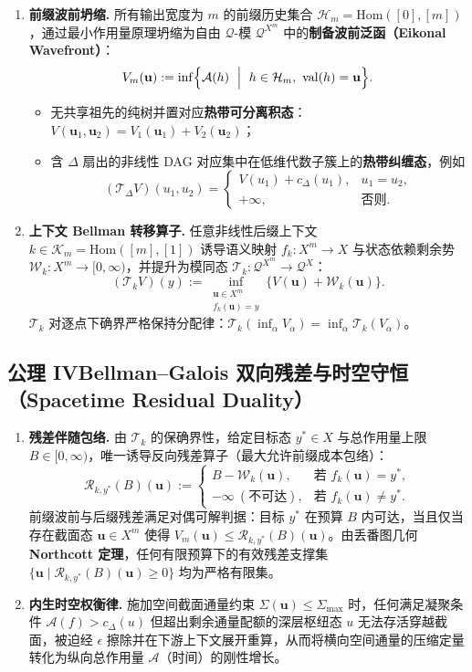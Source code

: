 \documentclass[11pt,a4paper]{ctexart}
\theoremstyle{plain}
\theoremstyle{definition}
\newcommand{\cA}{\mathcal{A}}
\newcommand{\cH}{\mathcal{H}}
\newcommand{\cK}{\mathcal{K}}
\newcommand{\cQ}{\mathcal{Q}}
\newcommand{\cT}{\mathcal{T}}
\newcommand{\cR}{\mathcal{R}}
\newcommand{\cW}{\mathcal{W}}
\newcommand{\cTDelta}{\mathcal{T}_{\Delta}}
\newcommand{\val}{\mathrm{val}}
\newcommand{\Hom}{\mathrm{Hom}}
\begin{document}
\begin{enumerate}
\item \textbf{前缀波前坍缩.} 所有输出宽度为 $m$ 的前缀历史集合 $\cH_m = \Hom([0], [m])$，通过最小作用量原理坍缩为自由 $\cQ$-模 $\cQ^{X^m}$ 中的\textbf{制备波前泛函（Eikonal Wavefront）}：
\[
V_m(\mathbf{u}) := \inf\Bigl\{ \cA(h) \ \Bigm|\ h \in \cH_m,\ \val(h) = \mathbf{u} \Bigr\}.
\]
\begin{itemize}
\item 无共享祖先的纯树并置对应\textbf{热带可分离积态}：$V(\mathbf{u}_1, \mathbf{u}_2) = V_1(\mathbf{u}_1) + V_2(\mathbf{u}_2)$；
\item 含 $\Delta$ 扇出的非线性 DAG 对应集中在低维代数子簇上的\textbf{热带纠缠态}，例如
\[
(\cTDelta V)(u_1, u_2) = \begin{cases} V(u_1) + c_\Delta(u_1), & u_1 = u_2, \\ +\infty, & \text{否则}. \end{cases}
\]
\end{itemize}

\item \textbf{上下文 Bellman 转移算子.} 任意非线性后缀上下文 $k \in \cK_m = \Hom([m], [1])$ 诱导语义映射 $f_k: X^m \to X$ 与状态依赖剩余势 $\cW_k: X^m \to [0, \infty)$，并提升为模同态 $\cT_k : \cQ^{X^m} \to \cQ^{X}$：
\[
(\cT_k V)(y) := \inf_{\substack{\mathbf{u} \in X^m \\ f_k(\mathbf{u}) = y}} \bigl\{ V(\mathbf{u}) + \cW_k(\mathbf{u}) \bigr\}.
\]
$\cT_k$ 对逐点下确界严格保持分配律：$\cT_k(\inf_\alpha V_\alpha) = \inf_\alpha \cT_k(V_\alpha)$。
\end{enumerate}

\subsection*{公理 IV\quad Bellman--Galois 双向残差与时空守恒（Spacetime Residual Duality）}

\begin{enumerate}
\item \textbf{残差伴随包络.} 由 $\cT_k$ 的保确界性，给定目标态 $y^* \in X$ 与总作用量上限 $B \in [0, \infty)$，唯一诱导反向残差算子（最大允许前缀成本包络）：
\[
\cR_{k, y^*}(B)(\mathbf{u}) :=
\begin{cases}
B - \cW_k(\mathbf{u}), & \text{若 } f_k(\mathbf{u}) = y^*, \\[2pt]
-\infty\ (\text{不可达}), & \text{若 } f_k(\mathbf{u}) \neq y^*.
\end{cases}
\]
前缀波前与后缀残差满足对偶可解判据：目标 $y^*$ 在预算 $B$ 内可达，当且仅当存在截面态 $\mathbf{u} \in X^m$ 使得 $V_m(\mathbf{u}) \le \cR_{k, y^*}(B)(\mathbf{u})$。由丢番图几何 \textbf{Northcott 定理}，任何有限预算下的有效残差支撑集 $\{\mathbf{u} \mid \cR_{k, y^*}(B)(\mathbf{u}) \ge 0\}$ 均为严格有限集。

\item \textbf{内生时空权衡律.} 施加空间截面通量约束 $\Sigma(\mathbf{u}) \le \Sigma_{\max}$ 时，任何满足凝聚条件 $\cA(f) > c_\Delta(u)$ 但超出剩余通量配额的深层枢纽态 $u$ 无法存活穿越截面，被迫经 $\epsilon$ 擦除并在下游上下文展开重算，从而将横向空间通量的压缩定量转化为纵向总作用量 $\cA$（时间）的刚性增长。
\end{enumerate}
\end{document}
